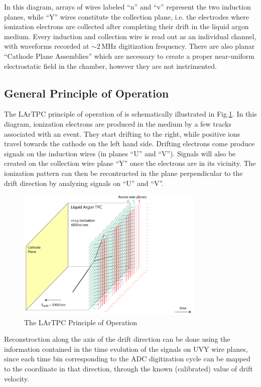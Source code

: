 \documentclass[a4paper]{jpconf}
\begin{document}
\noindent
In this diagram, arrays of wires labeled ``u'' and ``v'' represent the two induction planes, while ``Y'' wires constitute the
collection plane, i.e. the electrodes where ionization electrons are collected after completing their drift in the liquid argon medium.
Every induction and collection wire is read out as an individual channel, with waveforms recorded at $\sim$2\,MHz digitization frequency.
There are also planar ``Cathode Plane Assemblies'' which are necessary to create a proper near-uniform electrostatic field in
the chamber, however they are not instrimented.
\subsection{General Principle of Operation}
The LArTPC principle of operation of  is schematically illustrated in Fig.\ref{fig:lartpc-principle}.
In this diagram, ionization electrons are
produced in the medium by a few tracks associated with an event. They start drifting to the right, while
positive ions travel towards the cathode on the left hand side. Drifting electrons come produce signals on the induction wires (in planes ``U''
and ``V''). Signals will also be created on the collection wire plane ``Y'' once the electrons are in its vicinity. The ionization pattern can then be recontructed
 in the plane perpendicular to the drift direction by analyzing signals on ``U'' and ``V''. 
\begin{figure}[h!]
	\centering
	\includegraphics[width=0.8\textwidth]{signal-0.png}
	\caption{The LArTPC Principle of Operation}
	\label{fig:lartpc-principle}
\end{figure}
Reconstroction along the axis of the drift direction
can be done using the information contained in the time evolution of the signals on UVY wire planes, since each time bin corresponding to the
ADC digitization cycle can be mapped to the coordinate in that direction, through the known (calibrated) value of drift velocity.
\end{document}
